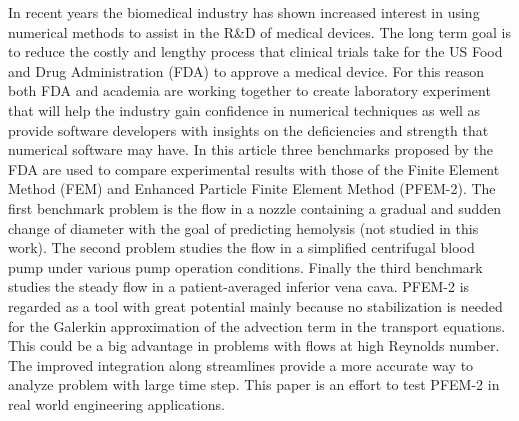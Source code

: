 In recent years the biomedical industry has shown increased interest in using numerical methods to assist in the R\&D of medical devices. The long term goal is to reduce the costly and lengthy process that clinical trials take for the US Food and Drug Administration (FDA) to approve a medical device. For this reason both FDA and academia are working together to create laboratory experiment that will help the industry gain confidence in numerical techniques as well as provide software developers with insights on the deficiencies and strength that numerical software may have. In this article three benchmarks proposed by the FDA are used to compare experimental results with those of the Finite Element Method (FEM) and Enhanced Particle Finite Element Method (PFEM-2). The first benchmark problem is the flow in a nozzle
containing a gradual and sudden change of diameter with the goal of predicting hemolysis (not studied in this work). The second problem studies the flow in a simplified centrifugal
blood pump under various pump operation conditions. Finally the third benchmark studies the steady flow in a patient-averaged inferior vena cava. PFEM-2 is regarded as a tool with great potential mainly because no stabilization is needed for the Galerkin approximation of the advection term in the transport equations. This could be a big advantage in problems with flows at high Reynolds number. The improved integration along streamlines provide a more accurate way to analyze problem with large time step. This paper is an effort to test PFEM-2 in real world engineering applications.
